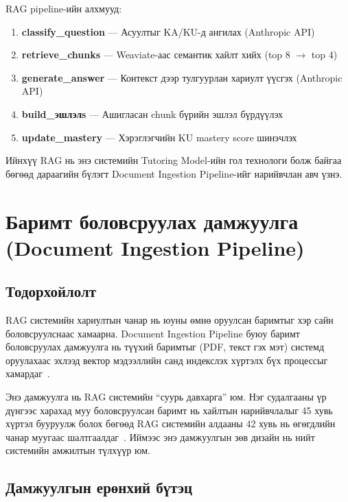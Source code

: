 \documentclass[12pt,A4]{report}
\begin{document}
RAG pipeline-ийн алхмууд:

\begin{enumerate}
    \item \textbf{classify\_question} --- Асуултыг KA/KU-д ангилах (Anthropic API)
    \item \textbf{retrieve\_chunks} --- Weaviate-аас семантик хайлт хийх (top 8 $\rightarrow$ top 4)
    \item \textbf{generate\_answer} --- Контекст дээр тулгуурлан хариулт үүсгэх (Anthropic API)
    \item \textbf{build\_эшлэлs} --- Ашигласан chunk бүрийн эшлэл бүрдүүлэх
    \item \textbf{update\_mastery} --- Хэрэглэгчийн KU mastery score шинэчлэх
\end{enumerate}

Ийнхүү RAG нь энэ системийн Tutoring Model-ийн гол технологи болж байгаа бөгөөд дараагийн бүлэгт Document Ingestion Pipeline-ийг нарийвчлан авч үзнэ.

\section{Баримт боловсруулах дамжуулга (Document Ingestion Pipeline)}

\subsection{Тодорхойлолт}

RAG системийн хариултын чанар нь юуны өмнө оруулсан баримтыг хэр сайн боловсруулснаас хамаарна. Document Ingestion Pipeline буюу баримт боловсруулах дамжуулга нь түүхий баримтыг (PDF, текст гэх мэт) системд оруулахаас эхлээд вектор мэдээллийн санд индекслэх хүртэлх бүх процессыг хамардаг~\cite{devto2026}.

Энэ дамжуулга нь RAG системийн ``суурь давхарга'' юм. Нэг судалгааны үр дүнгээс харахад муу боловсруулсан баримт нь хайлтын нарийвчлалыг 45 хувь хүртэл бууруулж болох бөгөөд RAG системийн алдааны 42 хувь нь өгөгдлийн чанар муугаас шалтгаалдаг~\cite{dhiwise2025}. Иймээс энэ дамжуулгын зөв дизайн нь нийт системийн амжилтын түлхүүр юм.

\subsection{Дамжуулгын ерөнхий бүтэц}
\end{document}
